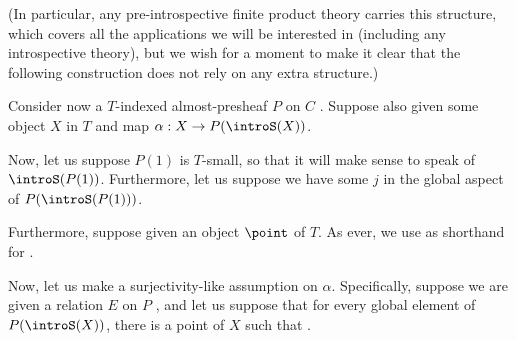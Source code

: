 (In particular, any pre-introspective finite product theory carries this structure, which covers all the applications we will be interested in (including any introspective theory), but we wish for a moment to make it clear that the following construction does not rely on any extra structure.)

Consider now a $T$-indexed almost-presheaf $P$ on $C$ . Suppose also given some object $X$ in $T$ and map $\alpha : X \to P(\introS(X))$.

Now, let us suppose $P(1)$ is $T$-small, so that it will make sense to speak of $\introS(P(1))$. Furthermore, let us suppose we have some $j$ in the global aspect of $P(\introS(P(1)))$.

Furthermore, suppose given an object $\point$ of $T$. As ever, we use  as shorthand for .

Now, let us make a surjectivity-like assumption on $\alpha$. Specifically, suppose we are given a relation $E$ on $P$ , and let us suppose that for every global element of $P(\introS(X))$, there is a point of $X$ such that \TODO.

